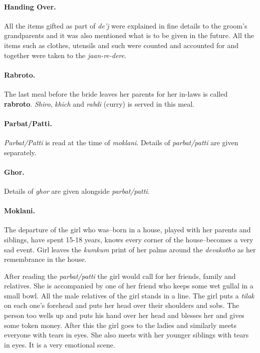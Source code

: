 \paragraph{Handing Over.} All the items gifted as part of \textit{de'j} were
explained in fine details to the groom's grandparents and it was also mentioned
what is to be given in the future. All the items such as clothes, utensils and
such were counted and accounted for and together were taken to the
\textit{jaan-re-dere}. 

\paragraph{Rabroto.} The last meal before the bride leaves her parents for her
in-laws is called \textbf{rabroto}. \textit{Shiro}, \textit{khich} and
\textit{rabdi} (curry) is served in this meal.

\paragraph{Parbat/Patti.} \textit{Parbat/Patti} is read at the time of
\textit{moklani}. Details of \textit{parbat/patti} are given separately.

\paragraph{Ghor.} Details of \textit{ghor} are given alongside
\textit{parbat/patti}.

\paragraph{Moklani.} The departure of the girl who was--born in a house, played
with her parents and siblings, have spent 15-18 years, knows every corner of
the house--becomes a very sad event. Girl leaves the \textit{kumkum} print of
her palms around the \textit{devakotho} as her remembrance in the house. 

After reading the \textit{parbat/patti} the girl would call for her friends,
family and relatives. She is accompanied by one of her friend who keeps
some wet gullal in a small bowl. All the male relatives of the girl
stands in a line. The girl puts a \textit{tilak} on each one's forehead
and puts her head over their shoulders and sobs. The person too wells up
and puts his hand over her head and blesses her and gives some token
money. After this the girl goes to the ladies and similarly meets
everyone with tears in eyes. She also meets with her younger siblings
with tears in eyes. It is a very emotional scene.

